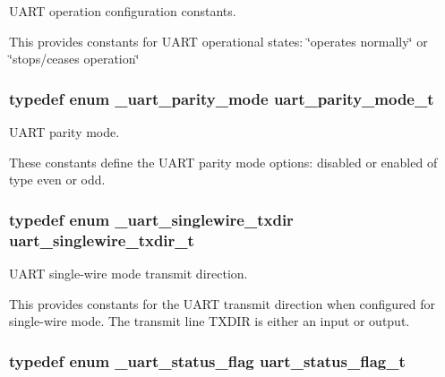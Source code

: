U\+A\+RT operation configuration constants. 

This provides constants for U\+A\+RT operational states\+: \char`\"{}operates normally\char`\"{} or \char`\"{}stops/ceases operation\char`\"{} 
\subsubsection[{\texorpdfstring{uart\+\_\+parity\+\_\+mode\+\_\+t}{uart_parity_mode_t}}]{\setlength{\rightskip}{0pt plus 5cm}typedef enum {\bf \+\_\+uart\+\_\+parity\+\_\+mode}  {\bf uart\+\_\+parity\+\_\+mode\+\_\+t}}\hypertarget{group__uart__hal_ga3d74bf70252b21a0dd19d61587ed320c}{}\label{group__uart__hal_ga3d74bf70252b21a0dd19d61587ed320c}


U\+A\+RT parity mode. 

These constants define the U\+A\+RT parity mode options\+: disabled or enabled of type even or odd. 
\subsubsection[{\texorpdfstring{uart\+\_\+singlewire\+\_\+txdir\+\_\+t}{uart_singlewire_txdir_t}}]{\setlength{\rightskip}{0pt plus 5cm}typedef enum {\bf \+\_\+uart\+\_\+singlewire\+\_\+txdir}  {\bf uart\+\_\+singlewire\+\_\+txdir\+\_\+t}}\hypertarget{group__uart__hal_ga5a158787a6da225f49f2372634b670c6}{}\label{group__uart__hal_ga5a158787a6da225f49f2372634b670c6}


U\+A\+RT single-\/wire mode transmit direction. 

This provides constants for the U\+A\+RT transmit direction when configured for single-\/wire mode. The transmit line T\+X\+D\+IR is either an input or output. 
\subsubsection[{\texorpdfstring{uart\+\_\+status\+\_\+flag\+\_\+t}{uart_status_flag_t}}]{\setlength{\rightskip}{0pt plus 5cm}typedef enum {\bf \+\_\+uart\+\_\+status\+\_\+flag}  {\bf uart\+\_\+status\+\_\+flag\+\_\+t}}\hypertarget{group__uart__hal_gab5a3fa1c858501bdf99d5f46bdb18672}{}\label{group__uart__hal_gab5a3fa1c858501bdf99d5f46bdb18672}


